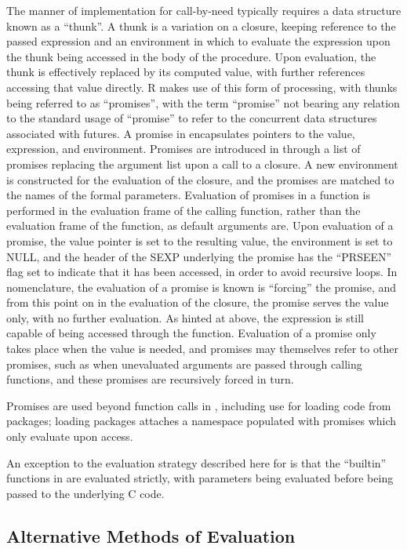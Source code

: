 The manner of implementation for call-by-need typically requires a data structure known as a ``thunk''\cite{ingerman1961thunks}.
A thunk is a variation on a closure, keeping reference to the passed expression and an environment in which to evaluate the expression upon the thunk being accessed in the body of the procedure.
Upon evaluation, the thunk is effectively replaced by its computed value, with further references accessing that value directly.
R makes use of this form of processing, with thunks being referred to as ``promises'', with the term ``promise'' not bearing any relation to the standard usage of ``promise'' to refer to the concurrent data structures associated with futures\cite{rcore2020lang:promise}.
A promise in \R{} encapsulates pointers to the value, expression, and environment.
Promises are introduced in \R{} through a list of promises replacing the argument list upon a call to a closure.
A new environment is constructed for the evaluation of the closure, and the promises are matched to the names of the formal parameters.
Evaluation of promises in a function is performed in the evaluation frame of the calling function, rather than the evaluation frame of the function, as default arguments are.
Upon evaluation of a promise, the value pointer is set to the resulting value, the environment is set to NULL, and the header of the SEXP underlying the promise has the ``PRSEEN'' flag set to indicate that it has been accessed, in order to avoid recursive loops.
In \R{} nomenclature, the evaluation of a promise is known is ``forcing'' the promise, and from this point on in the evaluation of the closure, the promise serves the value only, with no further evaluation.
As hinted at above, the expression is still capable of being accessed through the  function.
Evaluation of a promise only takes place when the value is needed, and promises may themselves refer to other promises, such as when unevaluated arguments are passed through calling functions, and these promises are recursively forced in turn.

Promises are used beyond function calls in \R{}, including use for loading code from packages; loading packages attaches a namespace populated with promises which only evaluate upon access.

An exception to the evaluation strategy described here for \R{} is that the ``builtin'' functions in \R{} are evaluated strictly, with parameters being evaluated before being passed to the underlying C code.

\subsection{Alternative Methods of Evaluation}

